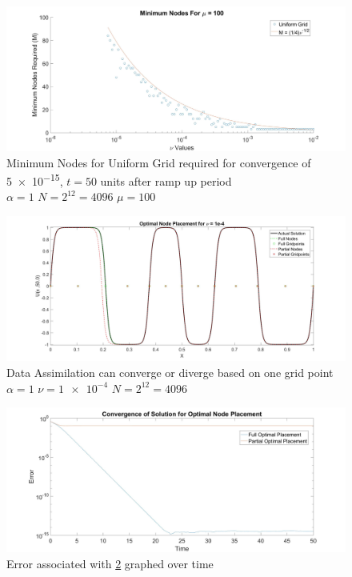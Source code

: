 \documentclass[12pt]{amsart}
\theoremstyle{plain}
\theoremstyle{definition}
\theoremstyle{remark}
\numberwithin{equation}{section} %
\numberwithin{figure}{section}   %
\begin{document}
\begin{figure}
	\centering
\includegraphics[scale=0.15]{MinimumNodes_Grid.jpg}
\caption{Minimum Nodes for Uniform Grid required for convergence of \num{5e-15}, $t=50$ units after ramp up period \\$\alpha = 1$ $N  =2^{12}=4096$ $\mu = 100$ }
\label{fig:minimumGrid}
\end{figure}
\begin{figure}
	\centering
	\includegraphics[scale=0.15]{Optimal.jpg}
	\caption{Data Assimilation can converge or diverge based on one grid point $\alpha = 1$ $\nu=\num{1e-4}$ $N = 2^{12}=4096$}
	\label{fig:optimal}
\end{figure}
\begin{figure}
	\centering
	\includegraphics[scale=0.15]{Error.jpg}
	\caption{Error associated with \cref{fig:optimal} graphed over time}
	\label{fig:minimumGridError}
\end{figure}
\end{document}
